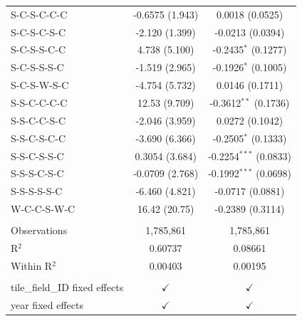 \begin{table}[H]
\begin{tabular}{lcc}
      S-C-S-C-C-C                     & -0.6575 (1.943)      & 0.0018 (0.0525)\\   
      S-C-S-C-S-C                     & -2.120 (1.399)       & -0.0213 (0.0394)\\   
      S-C-S-S-C-C                     & 4.738 (5.100)        & -0.2435$^{*}$ (0.1277)\\   
      S-C-S-S-S-C                     & -1.519 (2.965)       & -0.1926$^{*}$ (0.1005)\\   
      S-C-S-W-S-C                     & -4.754 (5.732)       & 0.0146 (0.1711)\\   
      S-S-C-C-C-C                     & 12.53 (9.709)        & -0.3612$^{**}$ (0.1736)\\   
      S-S-C-C-S-C                     & -2.046 (3.959)       & 0.0272 (0.1042)\\   
      S-S-C-S-C-C                     & -3.690 (6.366)       & -0.2505$^{*}$ (0.1333)\\   
      S-S-C-S-S-C                     & 0.3054 (3.684)       & -0.2254$^{***}$ (0.0833)\\   
      S-S-S-C-S-C                     & -0.0709 (2.768)      & -0.1992$^{***}$ (0.0698)\\   
      S-S-S-S-S-C                     & -6.460 (4.821)       & -0.0717 (0.0881)\\   
      W-C-C-S-W-C                     & 16.42 (20.75)        & -0.2389 (0.3114)\\   
       \\
      Observations                    & 1,785,861            & 1,785,861\\  
      R$^2$                           & 0.60737              & 0.08661\\  
      Within R$^2$                    & 0.00403              & 0.00195\\  
       \\
      tile\_field\_ID fixed effects   & $\checkmark$         & $\checkmark$\\   
      year fixed effects              & $\checkmark$         & $\checkmark$\\   
      \bottomrule
   \end{tabular}
\end{table}


